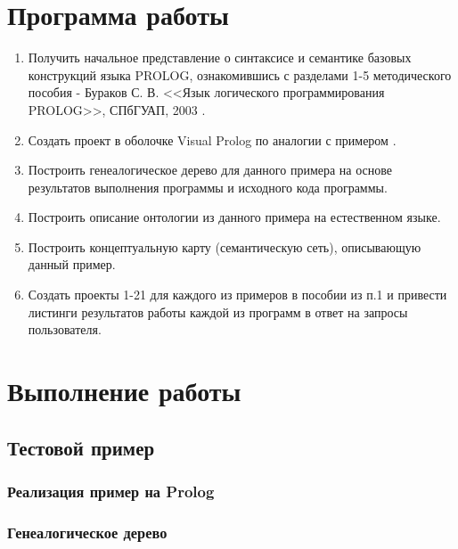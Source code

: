 





\tableofcontents
\newpage

\section{Программа работы}

\begin{enumerate}
	\item Получить начальное представление о синтаксисе и семантике базовых конструкций языка PROLOG, ознакомившись с разделами 1-5 методического пособия - Бураков С. В. <<Язык логического программирования PROLOG>>, СПбГУАП, 2003 \cite{burakov}.
	\item Создать проект в оболочке Visual Prolog по аналогии с примером \cite{visual-prolog}.
	\item Построить генеалогическое дерево для данного примера на основе результатов выполнения программы и исходного кода программы.
	\item Построить описание онтологии из данного примера на естественном языке.
	\item Построить концептуальную карту (семантическую сеть), описывающую данный пример.
	\item Создать проекты 1-21 для каждого из примеров в пособии из п.1 и привести листинги результатов работы каждой из программ в ответ на запросы пользователя.
\end{enumerate}

\section{Выполнение работы}

\subsection{Тестовой пример }

\subsubsection{Реализация пример на Prolog}


\subsubsection{Генеалогическое дерево}

